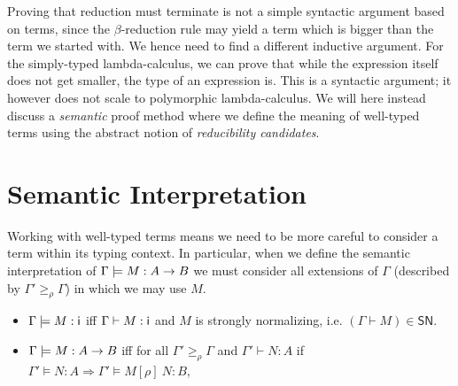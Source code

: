 \documentclass{article}
\newcommand{\ext}[1]{\geq_{#1}}
\newcommand{\SN}{\mathsf{SN}}
\newcommand{\imply}{\Longrightarrow}
\def\lv{\mathopen{{[\kern-0.14em[}}}    %
\def\rv{\mathclose{{]\kern-0.14em]}}}   %
\newcommand{\den}[1]{\lv #1 \rv}
\begin{document}
Proving that reduction must terminate is not a simple syntactic argument based on terms, since the $\beta$-reduction rule may yield a term which is bigger than the term we started with. We hence need to find a different inductive argument. For the simply-typed lambda-calculus, we can prove that while the expression itself does not get smaller,  the type of an expression is. This is a syntactic argument; it however does not scale to polymorphic lambda-calculus. We will here instead discuss a \emph{semantic} proof method where we define the meaning of well-typed terms using the abstract notion of \emph{reducibility candidates}. 



\section{Semantic Interpretation}
Working with well-typed terms means we need to be more careful to
consider a term within its typing context. In particular, when we
define the semantic interpretation of $\Gamma \models M : A \rightarrow B$
we must consider all extensions of $\Gamma$ (described by $\Gamma'
\ext \rho \Gamma$) in which we may use $M$.

\begin{itemize}
\item $\Gamma \models M : \textsf{i}$ iff $\Gamma \vdash M\mathrel{:} \textsf{i}$ and $M$ is strongly normalizing, i.e. $(\Gamma \vdash M) \in \SN$.
\item $\Gamma \models M : A \rightarrow B$ iff for all $\Gamma' \ext{\rho} \Gamma$ and $\Gamma' \vdash N :A$ if $\Gamma' \models N : A \imply \Gamma' \models M[\rho]~N : B$,
\end{itemize}





\end{document}
